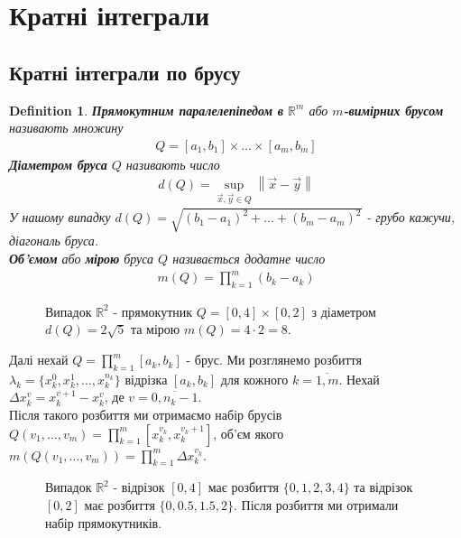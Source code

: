 \documentclass[a4paper, 10pt]{article}
\theoremstyle{theoremdd}
\theoremstyle{theoremdd}
\newtheorem{definition}[theorem]{Definition}
\theoremstyle{theoremdd}
\theoremstyle{theoremdd}
\theoremstyle{theoremdd}
\theoremstyle{theoremdd}
\theoremstyle{theoremdd}
\theoremstyle{theoremdd}
\newcommand\Norm[1]{\left\lVert#1\right\rVert}
\begin{document}
%
\tableofcontents
\newpage

\section{Кратні інтеграли}
\subsection{Кратні інтеграли по брусу}
\begin{definition}
\textbf{Прямокутним паралелепіпедом в} $\mathbb{R}^m$ або \textbf{$m$-вимірних брусом} називають множину
\begin{align*}
Q = [a_1,b_1] \times \dots \times [a_m,b_m]
\end{align*}
\textbf{Діаметром бруса} $Q$ називають число
\begin{align*}
d(Q) = \sup_{\vec{x},\vec{y} \in Q} \Norm{\vec{x}-\vec{y}}
\end{align*}
У нашому випадку $d(Q) = \sqrt{(b_1-a_1)^2 + \dots + (b_m-a_m)^2}$ - грубо кажучи, діагональ бруса.\\
\textbf{Об'ємом} або \textbf{мірою} бруса $Q$ називається додатне число
\begin{align*}
m(Q) = \prod_{k=1}^m (b_k-a_k)
\end{align*}
\end{definition}

\begin{figure}[H]
\centering
{}
\caption*{Випадок $\mathbb{R}^2$ - прямокутник $Q = [0,4] \times [0,2]$ з діаметром $d(Q) = 2 \sqrt{5}$ та мірою $m(Q) = 4 \cdot 2 = 8$.}
\end{figure}

Далі нехай $Q = \displaystyle\prod_{k=1}^m [a_k,b_k]$ - брус. Ми розглянемо розбиття $\lambda_k = \{x_k^0, x_k^1,\dots,x_k^{n_k} \}$ відрізка $[a_k,b_k]$ для кожного $k = \overline{1,m}$. Нехай $\Delta x_k^v = x_k^{v+1} - x_k^v$, де $v = \overline{0,n_k-1}$.\\
Після такого розбиття ми отримаємо набір брусів $Q(v_1,\dots,v_m) = \displaystyle\prod_{k=1}^m [x_{k}^{v_k}, x_k^{v_k+1}]$, об'єм якого $m(Q(v_1,\dots,v_m)) = \displaystyle\prod_{k=1}^m \Delta x_k^{v_k}$.

\begin{figure}[H]
\centering
{}
\caption*{Випадок $\mathbb{R}^2$ - відрізок $[0,4]$ має розбиття $\{0,1,2,3,4\}$ та відрізок $[0,2]$ має розбиття $\{0,0.5,1.5,2\}$. Після розбиття ми отримали набір прямокутників.}
\end{figure}
\end{document}

